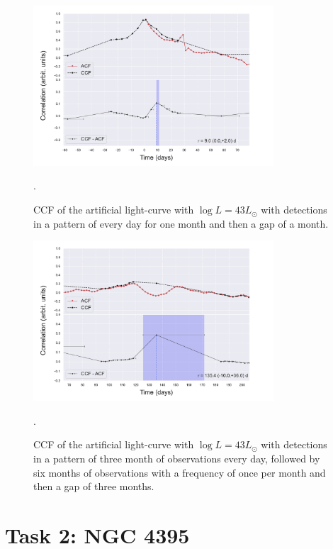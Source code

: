 \documentclass[letterpaper, oneside]{article}
\begin{document}
\begin{figure}[h]
	\centering
	\includegraphics[width=0.8\textwidth]{../artificial_x_y_month.pdf}
	\caption{CCF of the artificial light-curve with $\log L = 43 L_{\odot}$ with detections in a pattern of every day for one month and then a gap of a month.}.
	\label{fig:ccf_art_lc_L43_month}
\end{figure}

\begin{figure}[h]
	\centering
	\includegraphics[width=0.8\textwidth]{../artificial_x_y_lgaps.pdf}
	\caption{CCF of the artificial light-curve with $\log L = 43 L_{\odot}$ with detections in a pattern of three month of observations every day, followed by six months of observations with a frequency of once per month and then a gap of three months.}.
	\label{fig:ccf_art_lc_L43_lgaps}
\end{figure}


\section*{Task 2: NGC 4395}






\end{document}
